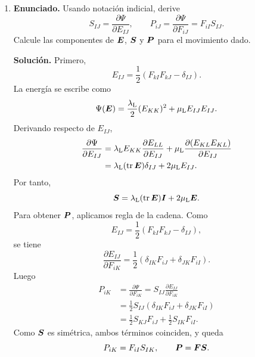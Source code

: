 \documentclass[11pt]{article}
\def\ten   #1{\mbox{\boldmath $#1$}{}}
\DeclareMathOperator{\tr}{tr}
\begin{document}
\begin{enumerate}[label=\textbf{\arabic*.}, leftmargin=*]
\begin{enumerate}[label=(\alph*), leftmargin=*]
    \item \textbf{Enunciado.} Usando notación indicial, derive
    \[
        S_{IJ}=\frac{\partial\Psi}{\partial E_{IJ}},
        \qquad
        P_{iJ}=\frac{\partial\Psi}{\partial F_{iJ}}=F_{iI}S_{IJ}.
    \]
    Calcule las componentes de $\ten E$, $\ten S$ y $\ten P$ para el movimiento dado.

    \textbf{Solución.} Primero,
    \[
        E_{IJ}=\frac12(F_{kI}F_{kJ}-\delta_{IJ}).
    \]
    La energía se escribe como
    \[
        \Psi(\ten E)=\frac{\lambda_{\mathrm L}}2(E_{KK})^2+
        \mu_{\mathrm L}E_{IJ}E_{IJ}.
    \]
    Derivando respecto de $E_{IJ}$,
    \[
    \begin{aligned}
        \frac{\partial\Psi}{\partial E_{IJ}}
        &=
        \lambda_{\mathrm L}E_{KK}\frac{\partial E_{LL}}{\partial E_{IJ}}
        +\mu_{\mathrm L}\frac{\partial(E_{KL}E_{KL})}{\partial E_{IJ}}\\
        &=
        \lambda_{\mathrm L}(\tr\ten E)\delta_{IJ}
        +2\mu_{\mathrm L}E_{IJ}.
    \end{aligned}
    \]
    Por tanto,
    \[
        \ten S=\lambda_{\mathrm L}(\tr\ten E)\ten I+2\mu_{\mathrm L}\ten E.
    \]
    Para obtener $\ten P$, aplicamos regla de la cadena. Como
    \[
        E_{IJ}=\frac12(F_{kI}F_{kJ}-\delta_{IJ}),
    \]
    se tiene
    \[
        \frac{\partial E_{IJ}}{\partial F_{iK}}
        =
        \frac12(\delta_{IK}F_{iJ}+\delta_{JK}F_{iI}).
    \]
    Luego
    \[
    \begin{aligned}
        P_{iK}
        &=
        \frac{\partial\Psi}{\partial F_{iK}}
        =
        S_{IJ}\frac{\partial E_{IJ}}{\partial F_{iK}}\\
        &=
        \frac12S_{IJ}(\delta_{IK}F_{iJ}+\delta_{JK}F_{iI})\\
        &=
        \frac12S_{KJ}F_{iJ}+\frac12S_{IK}F_{iI}.
    \end{aligned}
    \]
    Como $\ten S$ es simétrica, ambos términos coinciden, y queda
    \[
        P_{iK}=F_{iI}S_{IK},
        \qquad
        \ten P=\ten F\ten S.
    \]


\end{enumerate}
\end{enumerate}
\end{document}
